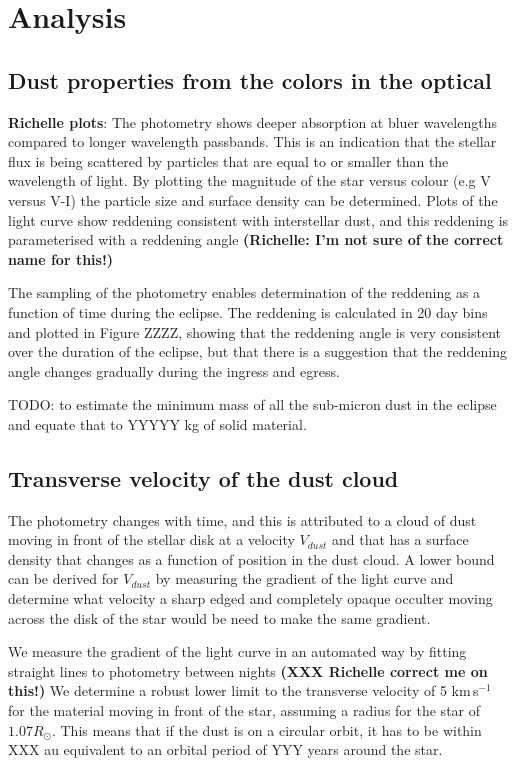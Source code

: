 \documentclass{aa}
\begin{document}
\section{Analysis}\label{sec:dustcloud}

\subsection{Dust properties from the colors in the optical}

{\bf Richelle plots}: The photometry shows deeper absorption at bluer wavelengths compared to longer wavelength passbands.
%
This is an indication that the stellar flux is being scattered by particles that are equal to or smaller than the wavelength of light.
%
By plotting the magnitude of the star versus colour (e.g V versus V-I) the particle size and surface density can be determined.
%
Plots of the light curve show reddening consistent with interstellar dust, and this reddening is parameterised with a reddening angle {\bf (Richelle: I'm not sure of the correct name for this!)}

The sampling of the photometry enables determination of the reddening as a function of time during the eclipse.
%
The reddening is calculated in 20 day bins and plotted in Figure ZZZZ, showing that the reddening angle is very consistent over the duration of the eclipse, but that there is a suggestion that the reddening angle changes gradually during the ingress and egress.

TODO: to estimate the minimum mass of all the sub-micron dust in the eclipse and equate that to YYYYY kg of solid material.

\subsection{Transverse velocity of the dust cloud}

The photometry changes with time, and this is attributed to a cloud of dust moving in front of the stellar disk at a velocity $V_{dust}$ and that has a surface density that changes as a function of position in the dust cloud.
%
A lower bound can be derived for $V_{dust}$ by measuring the gradient of the light curve and determine what velocity a sharp edged and completely opaque occulter moving across the disk of the star would be need to make the same gradient.

We measure the gradient of the light curve in an automated way by fitting straight lines to photometry between nights {\bf (XXX Richelle correct me on this!)}
%
We determine a robust lower limit to the transverse velocity of 5 km\,s$^{-1}$ for the material moving in front of the star, assuming a radius for the star of $1.07 R_\odot$.
%
This means that if the dust is on a circular orbit, it has to be within XXX au equivalent to an orbital period of YYY years around the star.
\end{document}
